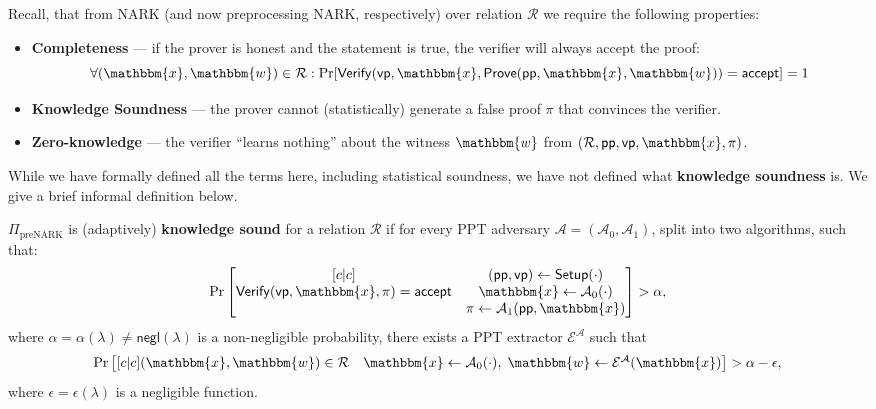 \documentclass[../../book.tex]{subfiles}
\begin{document}
Recall, that from NARK (and now preprocessing NARK, respectively) over relation
$\mathcal{R}$ we require the following properties:
\begin{itemize}
    \item \textbf{Completeness} --- if the prover is honest and the statement is
    true, the verifier will always accept the proof:
    \begin{equation*}
        \forall (\mathbbm{x},\mathbbm{w}) \in \mathcal{R}: \text{Pr}[\mathsf{Verify}(\mathsf{vp}, \mathbbm{x}, \mathsf{Prove}(\mathsf{pp},\mathbbm{x},\mathbbm{w})) = \mathsf{accept}] = 1
    \end{equation*}
    \item \textbf{Knowledge Soundness} --- the prover cannot (statistically)
    generate a false proof $\pi$ that convinces the verifier. 
    \item \textbf{Zero-knowledge} --- the verifier ``learns nothing'' about the
    witness $\mathbbm{w}$ from $(\mathcal{R},\mathsf{pp},\mathsf{vp},\mathbbm{x},\pi)$.
\end{itemize}

While we have formally defined all the terms here, including statistical
soundness, we have not defined what \textbf{knowledge soundness} is. We give a
brief informal definition below.

\begin{definition}
    $\Pi_{\text{preNARK}}$ is (adaptively) \textbf{knowledge sound} for a
    relation $\mathcal{R}$ if for every PPT adversary
    $\mathcal{A}=(\mathcal{A}_0,\mathcal{A}_1)$, split into two algorithms, such
    that:
    \begin{equation*}
        \text{Pr}\begin{bmatrix}[c|c]
            & (\mathsf{pp},\mathsf{vp}) \gets \mathsf{Setup}(\cdot)\\
            \mathsf{Verify}(\mathsf{vp},\mathbbm{x},\pi)=\mathsf{accept} & \mathbbm{x} \gets \mathcal{A}_0(\cdot)  \\
            & \pi \gets \mathcal{A}_1(\mathsf{pp},\mathbbm{x})
        \end{bmatrix} > \alpha,
    \end{equation*}
    where $\alpha=\alpha(\lambda) \neq \mathsf{negl}(\lambda)$ is a
    non-negligible probability, there exists a PPT extractor
    $\mathcal{E}^{\mathcal{A}}$ such that
    \begin{equation*}
        \text{Pr}\begin{bmatrix}[c|c]
            (\mathbbm{x},\mathbbm{w}) \in \mathcal{R} & \mathbbm{x} \gets \mathcal{A}_0(\cdot), \; \mathbbm{w} \gets \mathcal{E}^{\mathcal{A}}(\mathbbm{x})
        \end{bmatrix} > \alpha - \epsilon,
    \end{equation*}
    where $\epsilon = \epsilon(\lambda)$ is a negligible function.
\end{definition}
\end{document}
